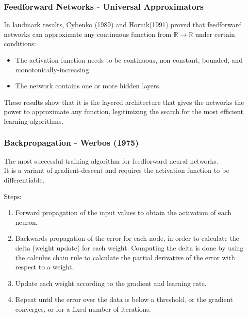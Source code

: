 \documentclass{beamer}
\begin{document}
\begin{frame}
\frametitle{Feedforward Networks - Universal Approximators}

In landmark results, Cybenko (1989) and Hornik(1991) proved that feedforward networks can approximate any continuous function from $\mathbb{R} \rightarrow \mathbb{R}$ under certain conditions:
\begin{center}
\begin{itemize}
\item The activation function needs to be continuous, non-constant, bounded, and monotonically-increasing.
\item The network contains one or more hidden layers.
\end{itemize}
\end{center}

These results show that it is the layered architecture that gives the networks the power to approximate any function, legitimizing the search for the most efficient learning algorithms.


\end{frame}



\begin{frame}
\frametitle{Backpropagation - Werbos (1975)}
The most successful training algorithm for feedforward neural networks.\\
It is a variant of gradient-descent and requires the activation function to be differentiable.

\vspace{3mm}
Steps:
\begin{enumerate}
\item Forward propagation of the input values to obtain the activation of each neuron.
\item Backwards propagation of the error for each node, in order to calculate the delta (weight update) for each weight. Computing the delta is done by using the calculus chain rule to calculate the partial derivative of the error with respect to a  weight.
\item Update each weight according to the gradient and learning rate. 
\item Repeat until the error over the data is below a threshold, or the gradient converges, or for a fixed number of iterations.
\end{enumerate}

\end{frame}
\end{document}
